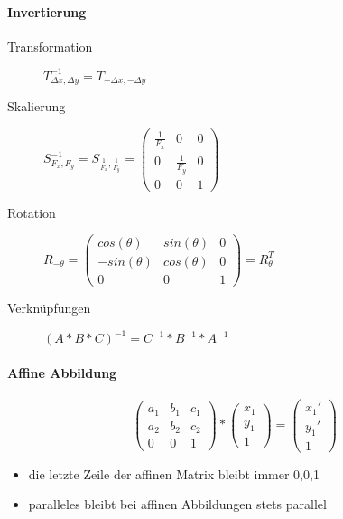 \documentclass[10pt,landscape]{article}
\begin{document}
\begin{multicols}{3}
\paragraph*{Invertierung}
\begin{description}
  \item[Transformation]  $T_{\Delta x, \Delta y}^{-1} = T_{-\Delta x, -\Delta y}$
  \item[Skalierung] $S_{F_x, F_y}^{-1}=S_{\frac{1}{F_x},\frac{1}{F_y}}=\begin{pmatrix} \frac{1}{F_x} &0&0\\ 0&\frac{1}{F_y}&0\\ 0&0&1 \end{pmatrix}$
  \item[Rotation] $R_{-\theta} = \begin{pmatrix} cos(\theta) & sin(\theta) & 0 \\ -sin(\theta) & cos(\theta) & 0 \\ 0 & 0 & 1 \end{pmatrix} = R_{\theta}^{T}$
  \item[Verknüpfungen] $(A*B*C)^{-1}=C^{-1}*B^{-1}*A^{-1}$
\end{description}

\paragraph{Affine Abbildung}
$$\begin{pmatrix}a_1 & b_1 & c_1\\a_2 &b_2 & c_2\\ 0&0&1\end{pmatrix}*\begin{pmatrix} x_1\\y_1\\1\end{pmatrix}= \begin{pmatrix}x_1'\\y_1'\\1 \end{pmatrix}$$
\begin{itemize}
  \item die letzte Zeile der affinen Matrix bleibt immer 0,0,1
  \item paralleles bleibt bei affinen Abbildungen stets parallel
\end{itemize}


\end{multicols}
\end{document}
